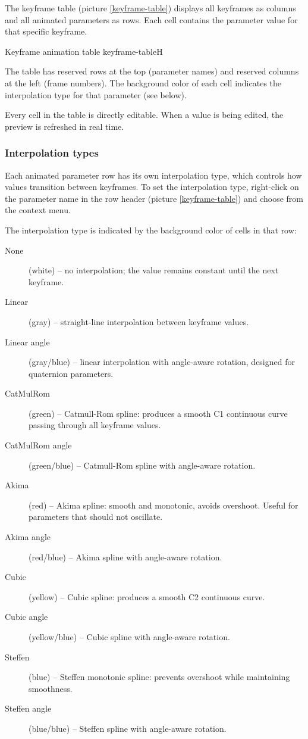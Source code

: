 The keyframe table (picture \ref{keyframe-table}) displays all keyframes as columns and all animated parameters as rows. Each cell contains the parameter value for that specific keyframe.

{Keyframe animation table}
{keyframe-table}{H}

The table has reserved rows at the top (parameter names) and reserved columns at the left (frame numbers). The background color of each cell indicates the interpolation type for that parameter (see below).

Every cell in the table is directly editable. When a value is being edited, the preview is refreshed in real time.

\subsubsection{Interpolation types}

Each animated parameter row has its own interpolation type, which controls how values transition between keyframes. To set the interpolation type, right-click on the parameter name in the row header (picture \ref{keyframe-table}) and choose from the context menu.

The interpolation type is indicated by the background color of cells in that row:

\begin{description}
	\item[None] (white) -- no interpolation; the value remains constant until the next keyframe.
	\item[Linear] (gray) -- straight-line interpolation between keyframe values.
	\item[Linear angle] (gray/blue) -- linear interpolation with angle-aware rotation, designed for quaternion parameters.
	\item[CatMulRom] (green) -- Catmull-Rom spline: produces a smooth C1 continuous curve passing through all keyframe values.
	\item[CatMulRom angle] (green/blue) -- Catmull-Rom spline with angle-aware rotation.
	\item[Akima] (red) -- Akima spline: smooth and monotonic, avoids overshoot. Useful for parameters that should not oscillate.
	\item[Akima angle] (red/blue) -- Akima spline with angle-aware rotation.
	\item[Cubic] (yellow) -- Cubic spline: produces a smooth C2 continuous curve.
	\item[Cubic angle] (yellow/blue) -- Cubic spline with angle-aware rotation.
	\item[Steffen] (blue) -- Steffen monotonic spline: prevents overshoot while maintaining smoothness.
	\item[Steffen angle] (blue/blue) -- Steffen spline with angle-aware rotation.
\end{description}

